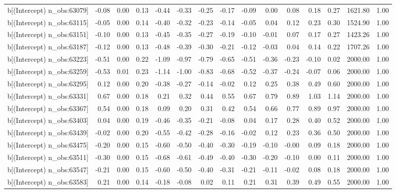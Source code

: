\begin{table}[ht]
\begin{tabular}{rrrrrrrrrrrrrrr}
  b[(Intercept) n\_obs:63079] & -0.08 & 0.00 & 0.13 & -0.44 & -0.33 & -0.25 & -0.17 & -0.09 & 0.00 & 0.08 & 0.18 & 0.27 & 1621.80 & 1.00 \\ 
  b[(Intercept) n\_obs:63115] & -0.05 & 0.00 & 0.14 & -0.40 & -0.32 & -0.23 & -0.14 & -0.05 & 0.04 & 0.12 & 0.23 & 0.30 & 1524.90 & 1.00 \\ 
  b[(Intercept) n\_obs:63151] & -0.10 & 0.00 & 0.13 & -0.45 & -0.35 & -0.27 & -0.19 & -0.10 & -0.01 & 0.07 & 0.17 & 0.27 & 1423.26 & 1.00 \\ 
  b[(Intercept) n\_obs:63187] & -0.12 & 0.00 & 0.13 & -0.48 & -0.39 & -0.30 & -0.21 & -0.12 & -0.03 & 0.04 & 0.14 & 0.22 & 1707.26 & 1.00 \\ 
  b[(Intercept) n\_obs:63223] & -0.51 & 0.00 & 0.22 & -1.09 & -0.97 & -0.79 & -0.65 & -0.51 & -0.36 & -0.23 & -0.10 & 0.02 & 2000.00 & 1.00 \\ 
  b[(Intercept) n\_obs:63259] & -0.53 & 0.01 & 0.23 & -1.14 & -1.00 & -0.83 & -0.68 & -0.52 & -0.37 & -0.24 & -0.07 & 0.06 & 2000.00 & 1.00 \\ 
  b[(Intercept) n\_obs:63295] & 0.12 & 0.00 & 0.20 & -0.38 & -0.27 & -0.14 & -0.02 & 0.12 & 0.25 & 0.38 & 0.49 & 0.60 & 2000.00 & 1.00 \\ 
  b[(Intercept) n\_obs:63331] & 0.67 & 0.00 & 0.18 & 0.21 & 0.32 & 0.44 & 0.55 & 0.67 & 0.79 & 0.89 & 1.03 & 1.14 & 2000.00 & 1.00 \\ 
  b[(Intercept) n\_obs:63367] & 0.54 & 0.00 & 0.18 & 0.09 & 0.20 & 0.31 & 0.42 & 0.54 & 0.66 & 0.77 & 0.89 & 0.97 & 2000.00 & 1.00 \\ 
  b[(Intercept) n\_obs:63403] & 0.04 & 0.00 & 0.19 & -0.46 & -0.35 & -0.21 & -0.08 & 0.04 & 0.17 & 0.28 & 0.40 & 0.52 & 2000.00 & 1.00 \\ 
  b[(Intercept) n\_obs:63439] & -0.02 & 0.00 & 0.20 & -0.55 & -0.42 & -0.28 & -0.16 & -0.02 & 0.12 & 0.23 & 0.36 & 0.50 & 2000.00 & 1.00 \\ 
  b[(Intercept) n\_obs:63475] & -0.20 & 0.00 & 0.15 & -0.60 & -0.50 & -0.40 & -0.30 & -0.19 & -0.10 & -0.00 & 0.09 & 0.18 & 2000.00 & 1.00 \\ 
  b[(Intercept) n\_obs:63511] & -0.30 & 0.00 & 0.15 & -0.68 & -0.61 & -0.49 & -0.40 & -0.30 & -0.20 & -0.10 & 0.00 & 0.11 & 2000.00 & 1.00 \\ 
  b[(Intercept) n\_obs:63547] & -0.21 & 0.00 & 0.15 & -0.60 & -0.50 & -0.40 & -0.31 & -0.21 & -0.11 & -0.02 & 0.08 & 0.18 & 2000.00 & 1.00 \\ 
  b[(Intercept) n\_obs:63583] & 0.21 & 0.00 & 0.14 & -0.18 & -0.08 & 0.02 & 0.11 & 0.21 & 0.31 & 0.39 & 0.49 & 0.55 & 2000.00 & 1.00 \\ 

\end{tabular}
\end{table}

